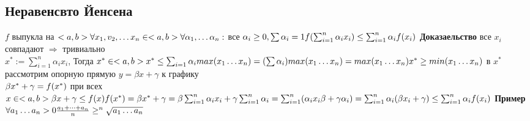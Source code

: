 \documentclass[12pt, a4paper]{article}
\begin{document}
	\subsection{Неравенсвто Йенсена}
	$ f $ выпукла на $ <a,b> \\
	\forall x_1,v_2, \dots x_n  \in <a,b> \\
	\forall \alpha_1, \dots \alpha_n : $ все $ \alpha_i \geq 0, \sum \alpha_i =1 \\
	f(\sum_{i=1}^n \alpha_i x_i ) \leq \sum_{i=1}^n \alpha_i f(x_i) \\$
	\textbf{Доказаельство}
	все $ x_i $ совпадают $ \Longrightarrow $ тривиально\\
	$x^* := \sum_{i=1}^n \alpha_i x_i$, Тогда $ x^* \in <a, b > \\
	x^* \leq  \sum_{i=1} \alpha_i max(x_1 \dots x_n) =  ( \sum \alpha_i) max(x_1 \dots x_n ) = max(x_1 \dots x_n) \\
	x^* \geq  min(x_1 \dots x_n)\\ $
	в $ x^* $ рассмотрим опорную прямую $ y= \beta x + \gamma  $ к графику \\
	$ \beta x^* + \gamma  = f(x^*) \\$
	при всех $ x \in <a,b> \\
	\beta x + \gamma \leq f(x) \\
	f(x^*) = \beta x^* + \gamma = \beta \sum_{i=1}^n \alpha_i x_i + \gamma \sum_{i =1 }^n \alpha_i = \sum_{i=1}^n(\alpha_i x_i \beta +\gamma \alpha_i) = \sum_{i =1}^n \alpha_i(\beta x_i + \gamma) \leq \sum_{i=1}^n \alpha_i f(x_i) \\ $
	\textbf{Пример} \\
	$ \forall a_1 \dots a_n > 0 \\
	\frac{a_1 + \dots + a_n}{n} \geq^n\sqrt{a_1 \dots a_n} \\ $
\end{document}
